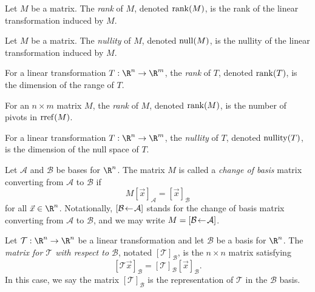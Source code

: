 \begin{SaveDefinition}[key=RankofaMatrix, title={Rank of a Matrix}]
	Let $M$ be a matrix.
	The \emph{rank} of $M$, denoted $\Rank(M)$, is the rank of
	the linear transformation induced by $M$.
\end{SaveDefinition}

\begin{SaveDefinition}[key=NullityofaMatrix, title={Nullity of a Matrix}]
	Let $M$ be a matrix.
	The \emph{nullity} of $M$, denoted $\Null(M)$, is the nullity of
	the linear transformation induced by $M$.
\end{SaveDefinition}

\begin{SaveDefinition}[key=Rank, title={Rank}]
	For a linear transformation $T:\R^n\to \R^m$, the
	\emph{rank} of $T$, denoted $\Rank(T)$, is the dimension of the range of
	$T$.

	For an $n\times m$ matrix $M$, the
	\emph{rank} of $M$, denoted $\Rank(M)$, is the number of pivots in
	$\rref(M)$.
\end{SaveDefinition}

\begin{SaveDefinition}[key=Nullity, title={Nullity}]
	For a linear transformation $T:\R^n\to \R^m$, the
	\emph{nullity} of $T$, denoted $\Nullity(T)$, is the dimension of the null space of
	$T$.
\end{SaveDefinition}

\begin{SaveDefinition}[key=ChangeofBasisMatrix, title={Change of Basis Matrix}]
	Let $\mathcal A$ and $\mathcal B$ be bases for $\R^n$. The matrix $M$ is called
	a \emph{change of basis} matrix converting from $\mathcal A$ to $\mathcal B$ if
	\[
		M[\vec x]_{\mathcal A}=[\vec x]_{\mathcal B}
	\]
	for all $\vec x\in \R^n$. Notationally, $\BasisChange{\mathcal A}{\mathcal B}$
	stands for the change of basis matrix converting from $\mathcal A$ to $\mathcal B$,
	and we may write $M=\BasisChange{\mathcal A}{\mathcal B}$.
\end{SaveDefinition}

\begin{SaveDefinition}[key=LinearTransformationinaBasis, title={Linear Transformation in a Basis}]
	Let $\mathcal T:\R^n\to\R^n$ be a linear transformation and let $\mathcal B$ be a
	basis for $\R^n$. The \emph{matrix for $\mathcal T$ with respect to $\mathcal B$}, notated
	$[\mathcal T]_{\mathcal B}$,
	is the $n\times n$ matrix satisfying
	\[
		[\mathcal T\vec x]_{\mathcal B} = [\mathcal T]_{\mathcal B}[\vec x]_{\mathcal B}.
	\]
	In this case, we say the matrix $[\mathcal T]_{\mathcal B}$ is the representation
	of $\mathcal T$ in the $\mathcal B$ basis.
\end{SaveDefinition}

